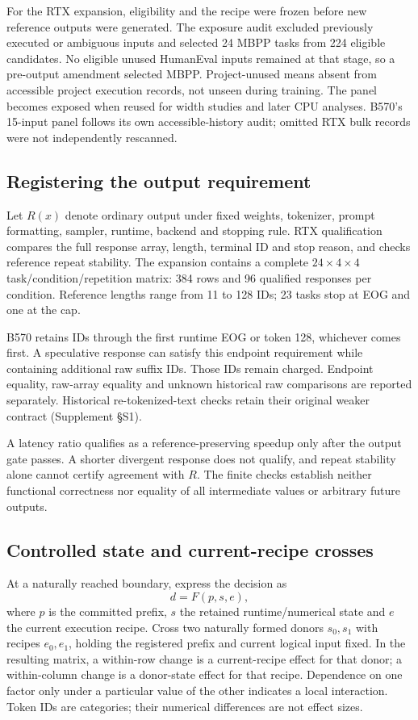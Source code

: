 For the RTX expansion, eligibility and the recipe were frozen before new reference outputs were generated. The exposure audit excluded previously executed or ambiguous inputs and selected 24 MBPP tasks from 224 eligible candidates. No eligible unused HumanEval inputs remained at that stage, so a pre-output amendment selected MBPP. Project-unused means absent from accessible project execution records, not unseen during training. The panel becomes exposed when reused for width studies and later CPU analyses. B570's 15-input panel follows its own accessible-history audit; omitted RTX bulk records were not independently rescanned.

\subsection{Registering the output requirement}
Let $R(x)$ denote ordinary output under fixed weights, tokenizer, prompt formatting, sampler, runtime, backend and stopping rule. RTX qualification compares the full response array, length, terminal ID and stop reason, and checks reference repeat stability. The expansion contains a complete $24\times4\times4$ task/condition/repetition matrix: 384 rows and 96 qualified responses per condition. Reference lengths range from 11 to 128 IDs; 23 tasks stop at EOG and one at the cap.

B570 retains IDs through the first runtime EOG or token 128, whichever comes first. A speculative response can satisfy this endpoint requirement while containing additional raw suffix IDs. Those IDs remain charged. Endpoint equality, raw-array equality and unknown historical raw comparisons are reported separately. Historical re-tokenized-text checks retain their original weaker contract (Supplement \S S1).

A latency ratio qualifies as a reference-preserving speedup only after the output gate passes. A shorter divergent response does not qualify, and repeat stability alone cannot certify agreement with $R$. The finite checks establish neither functional correctness nor equality of all intermediate values or arbitrary future outputs.

\subsection{Controlled state and current-recipe crosses}
At a naturally reached boundary, express the decision as
\begin{equation}
d=F(p,s,e),
\label{eq:decision}
\end{equation}
where $p$ is the committed prefix, $s$ the retained runtime/numerical state and $e$ the current execution recipe. Cross two naturally formed donors $s_0,s_1$ with recipes $e_0,e_1$, holding the registered prefix and current logical input fixed. In the resulting matrix, a within-row change is a current-recipe effect for that donor; a within-column change is a donor-state effect for that recipe. Dependence on one factor only under a particular value of the other indicates a local interaction. Token IDs are categories; their numerical differences are not effect sizes.

